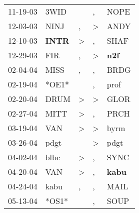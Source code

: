 \begin{supertabular}{p{0.07\textwidth}p{0.06\textwidth}p{0.02\textwidth}p{0.02\textwidth}p{0.06\textwidth}}
          11-19-03\textsuperscript{} &           3WID\textsuperscript{} &                  &                , &           NOPE\textsuperscript{} \\
          12-03-03\textsuperscript{} &           NINJ\textsuperscript{} &                , &     \textgreater &           ANDY\textsuperscript{} \\
          12-10-03\textsuperscript{} &  \textbf{INTR\textsuperscript{}} &     \textgreater &                , &           SHAF\textsuperscript{} \\
          12-29-03\textsuperscript{} &            FIR\textsuperscript{} &                , &     \textgreater &   \textbf{n2f\textsuperscript{}} \\
          02-04-04\textsuperscript{} &           MISS\textsuperscript{} &                , &                , &           BRDG\textsuperscript{} \\
          02-19-04\textsuperscript{} &                            *OE1* &                  &                , &           prof\textsuperscript{} \\
          02-20-04\textsuperscript{} &           DRUM\textsuperscript{} &     \textgreater &     \textgreater &           GLOR\textsuperscript{} \\
          02-27-04\textsuperscript{} &           MITT\textsuperscript{} &     \textgreater &                , &           PRCH\textsuperscript{} \\
          03-19-04\textsuperscript{} &            VAN\textsuperscript{} &     \textgreater &     \textgreater &           byrm\textsuperscript{} \\
          03-26-04\textsuperscript{} &           pdgt\textsuperscript{} &                  &     \textgreater &           pdgt\textsuperscript{} \\
          04-02-04\textsuperscript{} &           blbc\textsuperscript{} &     \textgreater &                , &           SYNC\textsuperscript{} \\
          04-20-04\textsuperscript{} &            VAN\textsuperscript{} &     \textgreater &                , &  \textbf{kabu\textsuperscript{}} \\
          04-24-04\textsuperscript{} &           kabu\textsuperscript{} &                , &                , &           MAIL\textsuperscript{} \\
          05-13-04\textsuperscript{} &                            *OS1* &                  &                , &           SOUP\textsuperscript{} \\

\end{supertabular}
